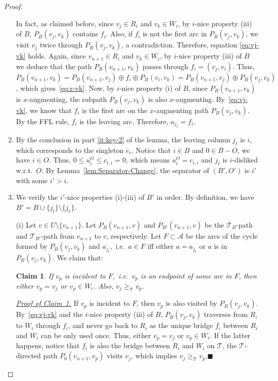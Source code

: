 \documentclass[11pt]{article}
\newtheorem{claim}[theorem]{Claim}
\begin{document}
\begin{proof}
\begin{enumerate}
\begin{equation}
    \end{equation}
     In fact, as claimed before, since $v_j\in R_i$ and $v_k\in W_i$, by $i$-nice property (iii) of $B$, $P_B(v_j,v_k)$ contains $f_i$. Also, if $f_i$ is not the first arc in $P_B(v_j,v_k)$, we visit $v_j$ twice through $P_B(v_j,v_k)$, a contradiction. Therefore, equation \eqref{eq:vj-vk} holds. Again, since $v_{n+1}\in R_i$ and $v_k\in W_i$, by $i$-nice property (iii) of $B$ we deduce that the path $P_B(v_{n+1},v_k)$ passes through $f_i=(v_j,v_i)$. Thus, $P_B(v_{n+1},v_k)=P_B(v_{n+1},v_j)\oplus f_i\oplus P_B(v_i,v_k)=P_B(v_{n+1},v_j)\oplus P_B(v_j,v_k)$, which gives~\eqref{eq:r-vk}. Now, by $i$-nice property (i) of $B$, since $P_B(v_{n+1},v_k)$ is $x$-augmenting, the subpath $P_B(v_j,v_k)$ is also $x$-augmenting. By~\eqref{eq:vj-vk}, we know that $f_i$ is the first arc on the $x$-augmenting path $P_B(v_j,v_k)$. By the FFL rule, $f_i$ is the leaving arc. Therefore, $a_{j_\ell}=f_i$.
\item By the conclusion in part \ref{it:key-2} of the lemma, the leaving column $j_\ell$ is $i$, which corresponds to the singleton $e_i$. Notice that $i\in B$ and $0\in B-O$, we have $i\in O$. Thus, $0\le u^O_i\le c_{i,i}=0$, which means $u^O_i=c_{i,i}$ and $j_\ell$ is $i$-disliked w.r.t.~$O$. By Lemma~\ref{lem:Separator-Change}, the separator of $(B',O')$ is $i'$ with some $i'>i.$
    \item We verify the $i'$-nice properties (i)-(iii) of $B'$ in order. By definition, we have $B'=B\cup\{j_t\}\setminus \{j_\ell\}$. 

    (i) Let $v\in U\setminus\{v_{n+1}\}$. Let $P_B(v_{n+1},v)$ and $P_{B'}(v_{n+1},v)$ be the $\mathcal{T}_B$-path and $\mathcal{T}_{B'}$-path from $v_{n+1}$ to $v$, respectively. Let $F\subset\mathcal{A}$ be the arcs of the cycle formed by $P_B(v_j,v_k)$ and $a_{j_t}$,~i.e.~$a\in F$ iff either $a=a_{j_t}$ or $a$ is in $P_B(v_j,v_k)$. We claim that:
    \begin{claim}\label{cl:bad-vertex}
        If $v_p$ is incident to $F$,~i.e.~$v_p$ is an endpoint of some arc in $F$, then either $v_p=v_j$ or $v_p\in W_i$. Also, $v_j\ge_{\mathcal{T}}v_p$.
\end{claim}
    \noindent \emph{\underline{Proof of Claim~\ref{cl:bad-vertex}.}} If $v_p$ is incident to $F$, then $v_p$ is also visited by $P_B(v_j,v_k)$. By~\eqref{eq:vj-vk} and the $i$-nice property (iii) of $B$, $P_B(v_j,v_k)$ traverses from $R_i$ to $W_i$ through $f_i$, and never go back to $R_i$ as the unique bridge $f_i$ between $R_i$ and $W_i$ can be only used once. Thus, either $v_p=v_j$ or $v_p\in W_i$. If the latter happens, notice that $f_i$ is also the bridge between $R_i$ and $W_i$ on $\mathcal{T}$, the $\mathcal{T}$-directed path $P_0(v_{n+1},v_p)$ visits $v_j$, which implies $v_j\ge_{\mathcal{T}}v_p$.\hfill $ \blacksquare$    



\end{enumerate}
\end{proof}
\end{document}
